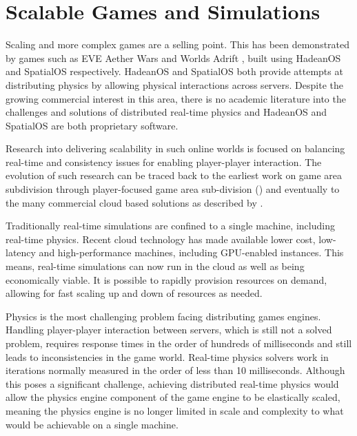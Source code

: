 \section{Scalable Games and Simulations}
Scaling and more complex games are a selling point. This has been demonstrated by games such as EVE Aether Wars \cite{AetherEngine} and Worlds Adrift \cite{WorldsAd48:online}, built using HadeanOS and SpatialOS respectively. HadeanOS and SpatialOS both provide attempts at distributing physics by allowing physical interactions across servers. Despite the growing commercial interest in this area, there is no academic literature into the challenges and solutions of distributed real-time physics and HadeanOS and SpatialOS are both proprietary software.

Research into delivering scalability in such online worlds is focused on balancing real-time and consistency issues for enabling player-player interaction. The evolution of such research can be traced back to the earliest work on game area subdivision \cite{Npsnet} through player-focused game area sub-division (\cite{Morgan2005InterestManagement, Greenhalgh}) and eventually to the many commercial cloud based solutions as described by \cite{iCloudAccess}.

Traditionally real-time simulations are confined to a single machine, including real-time physics. 
Recent cloud technology has made available lower cost, low-latency and high-performance machines, including GPU-enabled instances. This means, real-time simulations can now run in the cloud as well as being economically viable. It is possible to rapidly provision resources on demand, allowing for fast scaling up and down of resources as needed.

Physics is the most challenging problem facing distributing games engines. Handling player-player interaction between servers, which is still not a solved problem, requires response times in the order of hundreds of milliseconds and still leads to inconsistencies in the game world. Real-time physics solvers work in iterations normally measured in the order of less than 10 milliseconds. Although this poses a significant challenge, achieving distributed real-time physics would allow the physics engine component of the game engine to be elastically scaled, meaning the physics engine is no longer limited in scale and complexity to what would be achievable on a single machine.



